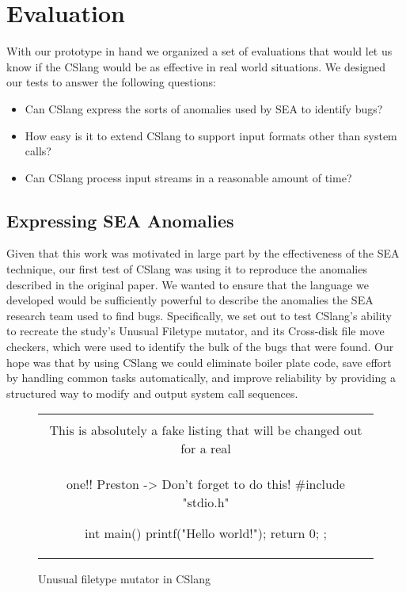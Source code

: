 \section{Evaluation}
\label{SEC:evaluation}

With our prototype in hand we organized a set of
evaluations that would let us know if the CSlang would be as effective
in real world situations.
We designed our tests to answer the following questions:

\begin{itemize}

  \item{Can CSlang express the sorts of anomalies used by SEA to identify
    bugs?}

  \item{How easy is it to extend CSlang to support input formats other than
    system calls?}

  \item{Can CSlang process input streams in a reasonable amount of time?}

\end{itemize}


\subsection{Expressing SEA Anomalies}
\label{sub:SEAAnomalies}
Given that this work was motivated
in large part
by the effectiveness of the SEA technique,
our first test of CSlang was using it to reproduce the anomalies described
in the original paper.
We wanted to ensure that
the language we developed
would be sufficiently powerful
to describe the anomalies the
SEA research team used to
find bugs.
Specifically,
we set out to test CSlang's ability to recreate
the study's Unusual Filetype mutator,
and its Cross-disk file move checkers, which were used to identify
the bulk of
the bugs that were found.
Our hope was that by using CSlang we could eliminate boiler plate code,
save effort by handling common tasks automatically, and improve reliability
by providing a structured way to modify and output system call sequences.

\begin{figure}[H]
\centering
\begin{tabular}{c}
\begin{lstlisting}
\\ This is absolutely a fake listing that will be changed out for a real
\\ one!!  Preston -> Don't forget to do this!
#include "stdio.h"

int main() {
    printf("Hello world!\n");
    return 0;
};
\end{lstlisting}
\end{tabular}
\caption{Unusual filetype mutator in CSlang}
\label{lst:UnusualFiletypeCSlang}
\end{figure}

